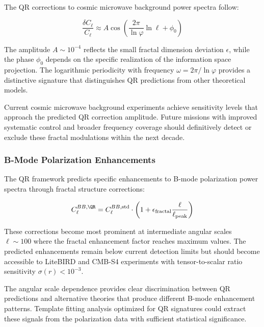 The QR corrections to cosmic microwave background power spectra follow:

\begin{equation}
\frac{\delta C_\ell}{C_\ell} \approx A \cos\left(\frac{2\pi}{\ln \varphi} \ln \ell + \phi_0\right)
\label{eq:cmb-fractal-modulation}
\end{equation}

The amplitude $A \sim 10^{-4}$ reflects the small fractal dimension deviation $\epsilon$, while the phase $\phi_0$ depends on the specific realization of the information space projection. The logarithmic periodicity with frequency $\omega = 2\pi/\ln \varphi$ provides a distinctive signature that distinguishes QR predictions from other theoretical models.

Current cosmic microwave background experiments achieve sensitivity levels that approach the predicted QR correction amplitude. Future missions with improved systematic control and broader frequency coverage should definitively detect or exclude these fractal modulations within the next decade.

\subsubsection{B-Mode Polarization Enhancements}
\label{subsubsec:b-mode-enhancements}

The QR framework predicts specific enhancements to B-mode polarization power spectra through fractal structure corrections:

\begin{equation}
C_\ell^{BB,\QR} = C_\ell^{BB,\text{std}} \cdot \left(1 + \epsilon_{\text{fractal}} \frac{\ell}{\ell_{\text{peak}}}\right)
\label{eq:b-mode-enhancement}
\end{equation}

These corrections become most prominent at intermediate angular scales $\ell \sim 100$ where the fractal enhancement factor reaches maximum values. The predicted enhancements remain below current detection limits but should become accessible to LiteBIRD and CMB-S4 experiments with tensor-to-scalar ratio sensitivity $\sigma(r) < 10^{-3}$.

The angular scale dependence provides clear discrimination between QR predictions and alternative theories that produce different B-mode enhancement patterns. Template fitting analysis optimized for QR signatures could extract these signals from the polarization data with sufficient statistical significance.

